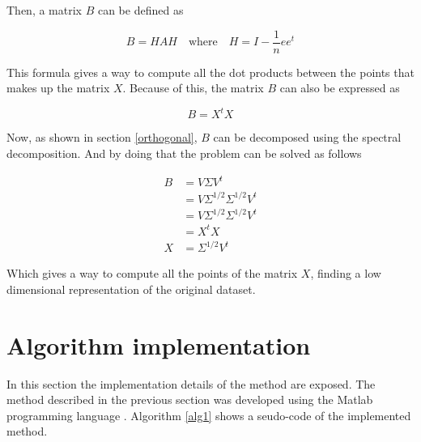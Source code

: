 \documentclass[12pt,journal]{IEEEtran}
\begin{document}
    Then, a matrix $B$ can be defined as

    \begin{equation*}
        B = H A H \quad \text{where} \quad H = I - \frac{1}{n} e e^t
    \end{equation*}

    This formula gives a way to compute all the dot products between the points
    that makes up the matrix $X$. Because of this, the matrix $B$ can also
    be expressed as

    \begin{equation*}
        B = X^tX
    \end{equation*}

    Now, as shown in section \ref{orthogonal}, $B$ can be decomposed using the
    spectral decomposition. And by doing that the problem can be solved as follows

    \begin{equation*}
        \begin{aligned}
            B &= V \Sigma V^t\\
              &= V \Sigma^{1/2} \Sigma^{1/2} V^t\\
              &= V \Sigma^{1/2} \Sigma^{1/2} V^t\\
              &= X^t X\\
            X & = \Sigma^{1/2} V^t
        \end{aligned}
    \end{equation*}

    Which gives a way to compute all the points of the matrix $X$, finding a low
    dimensional representation of the original dataset.

\section{Algorithm implementation}

In this section the implementation details of the method are exposed. The method
described in the previous section was developed using the Matlab programming
language \cite{matlab}. Algorithm \ref{alg1} shows a seudo-code of the
implemented method.
\end{document}
